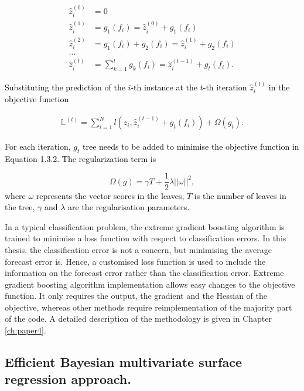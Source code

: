 \documentclass{monashthesis}
\begin{document}
\vspace*{-\baselineskip}

\begin{align*} 
\hat{z}_i^{(0)} &=  0 \\ 
\hat{z}_i^{(1)} &=  g_1(f_i) =  \hat{z}_i^{(0)}+g_1(f_i)\\ 
\hat{z}_i^{(2)} &=  g_1(f_i)+g_2(f_i) =  \hat{z}_i^{(1)}+g_2(f_i)\\ 
\dots\\
\hat{z}_i^{(t)} &=  \sum_{k=1}^{t}g_k(f_i) =  \hat{z}_i^{(t-1)}+g_t(f_i).
\end{align*}

\textcolor{black}{Substituting the prediction of the $i$-th instance at the $t$-th iteration $\hat{z}_i^{(t)}$ in the objective function }

\vspace*{-\baselineskip}

\begin{align}
\mathbb{L}^{(t)}= \sum_{i=1}^{N} l(z_i, \hat{z}_i^{(t-1)}+g_t(f_i))+\Omega(g_t).
\end{align}

\textcolor{black}{For each iteration, $g_t$ tree needs to be added to minimise the objective function in Equation 1.3.2. The regularization term is}
\vspace*{-\baselineskip}

\[\Omega(g) = \gamma T + \frac{1}{2}\lambda||\omega||^2,\]
\textcolor{black}{where $\omega$ represents the vector scores in the leaves, $T$ is the number of leaves in the tree, $\gamma$ and $\lambda$ are the regularisation parameters.}

In a typical classification problem, the extreme gradient boosting algorithm is trained to minimise a loss function with respect to classification errors. In this thesis, the classification error is not a concern, but minimising the average forecast error is. Hence, a customised loss function is used to include the information on the forecast error rather than the classification error. Extreme gradient boosting algorithm implementation allows easy changes to the objective function. It only requires the output, the gradient and the Hessian of the objective, whereas other methods require reimplementation of the majority part of the code. A detailed description of the methodology is given in Chapter \ref{ch:paper4}.

\hypertarget{efficient-bayesian-multivariate-surface-regression-approach.}{%
\subsection{Efficient Bayesian multivariate surface regression approach.}\label{efficient-bayesian-multivariate-surface-regression-approach.}}
\end{document}

